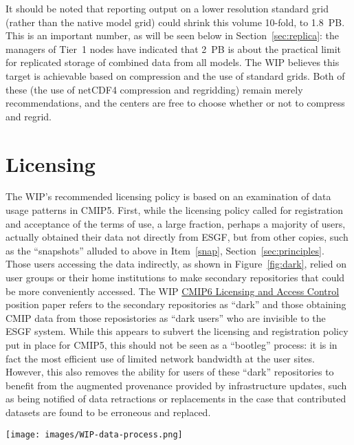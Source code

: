 \documentclass[gmd,manuscript]{copernicus}
\newcommand{\figref}[1] {\mbox{Figure   \ref{fig:#1}}}
\newcommand{\secref}[1] {\mbox{Section  \ref{sec:#1}}}
\begin{document}
It should be noted that reporting output on a lower
resolution standard grid (rather than the native model grid) could
shrink this volume 10-fold, to 1.8~PB. This is an important number, as
will be seen below in \secref{replica}: the managers of Tier~1 nodes
have indicated that 2~PB is about the practical limit for replicated
storage of combined data from all models. The WIP believes
this target is achievable based on compression and the use of standard
grids. Both of these (the use of netCDF4 compression and regridding)
remain merely recommendations, and the centers are free to choose
whether or not to compress and regrid.

\section{Licensing}
\label{sec:licensing}

The WIP's recommended licensing policy is based on an examination of
data usage patterns in CMIP5. First, while the licensing policy called
for registration and acceptance of the terms of use, a large fraction,
perhaps a majority of users, actually obtained their data not directly
from ESGF, but from other copies, such as the ``snapshots'' alluded to
above in Item~\ref{snap}, \secref{principles}. Those users accessing
the data indirectly, as shown in \figref{dark}, relied on user groups
or their home institutions to make secondary repositories that could
be more conveniently accessed. The WIP
\href{https://goo.gl/7vHsPU}{CMIP6 Licensing and Access Control}
position paper refers to the secondary repositories as ``dark'' and
those obtaining CMIP data from those reposistories as ``dark users''
who are invisible to the ESGF system. While this appears to subvert
the licensing and registration policy put in place for CMIP5, this
should not be seen as a ``bootleg'' process: it is in fact the most
efficient use of limited network bandwidth at the user sites. However,
this also removes the ability for users of these ``dark'' repositories
to benefit from the augmented provenance provided by infrastructure
updates, such as being notified of data retractions or replacements in
the case that contributed datasets are found to be erroneous and
replaced.

\begin{figure*}
  \begin{center}
    \texttt{[image: images/WIP-data-process.png]}
  \end{center}
  \caption{Typical data usage pattern in CMIP5 involved users making
    local copies, and user groups making institutional-scale caches
    from ESGF. Figure courtesy Stephan Kindermann, DKRZ, adapted from
    WIP Licensing White Paper.}
  \label{fig:dark}
\end{figure*}
\end{document}
